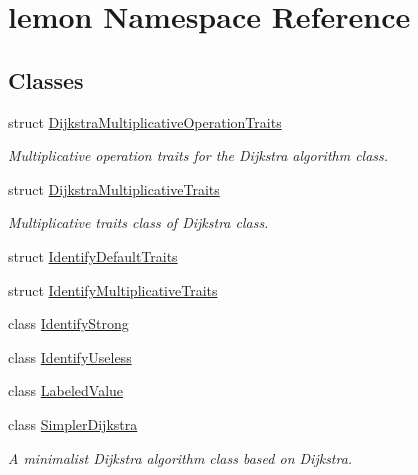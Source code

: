 \hypertarget{namespacelemon}{}\section{lemon Namespace Reference}
\label{namespacelemon}
\subsection*{Classes}
\begin{DoxyCompactItemize}
\item 
struct \hyperlink{structlemon_1_1_dijkstra_multiplicative_operation_traits}{Dijkstra\+Multiplicative\+Operation\+Traits}
\begin{DoxyCompactList}\small\item\em Multiplicative operation traits for the Dijkstra algorithm class. \end{DoxyCompactList}\item 
struct \hyperlink{structlemon_1_1_dijkstra_multiplicative_traits}{Dijkstra\+Multiplicative\+Traits}
\begin{DoxyCompactList}\small\item\em Multiplicative traits class of Dijkstra class. \end{DoxyCompactList}\item 
struct \hyperlink{structlemon_1_1_identify_default_traits}{Identify\+Default\+Traits}
\item 
struct \hyperlink{structlemon_1_1_identify_multiplicative_traits}{Identify\+Multiplicative\+Traits}
\item 
class \hyperlink{classlemon_1_1_identify_strong}{Identify\+Strong}
\item 
class \hyperlink{classlemon_1_1_identify_useless}{Identify\+Useless}
\item 
class \hyperlink{classlemon_1_1_labeled_value}{Labeled\+Value}
\item 
class \hyperlink{classlemon_1_1_simpler_dijkstra}{Simpler\+Dijkstra}
\begin{DoxyCompactList}\small\item\em A minimalist Dijkstra algorithm class based on Dijkstra. \end{DoxyCompactList}\end{DoxyCompactItemize}
